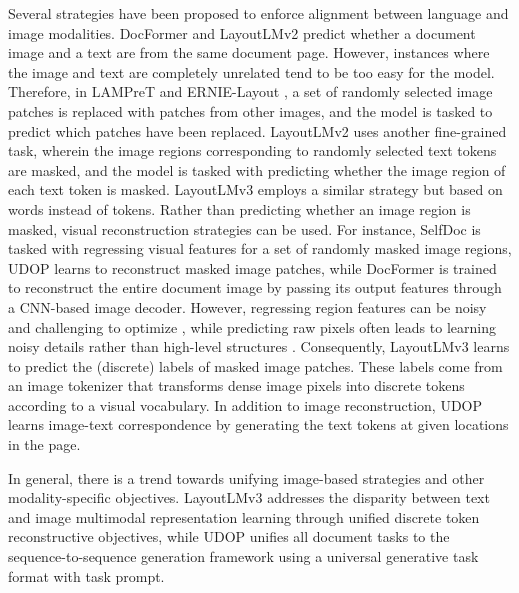 Several strategies have been proposed to enforce alignment between language and image modalities. DocFormer \citep{appalaraju2021docformer} and LayoutLMv2 \citep{xu2020layoutlmv2} predict whether a document image and a text are from the same document page. However, instances where the image and text are completely unrelated tend to be too easy for the model. Therefore, in \ac{LAMPreT} \citep{wu2021lampret} and ERNIE-Layout \citep{peng2022ernie}, a set of randomly selected image patches is replaced with patches from other images, and the model is tasked to predict which patches have been replaced. LayoutLMv2 uses another fine-grained task, wherein the image regions corresponding to randomly selected text tokens are masked, and the model is tasked with predicting whether the image region of each text token is masked. LayoutLMv3 \citep{huang2022layoutlmv3} employs a similar strategy but based on words instead of tokens. Rather than predicting whether an image region is masked, visual reconstruction strategies can be used. For instance, SelfDoc \citep{li2021selfdoc} is tasked with regressing visual features for a set of randomly masked image regions, UDOP \citep{tang2023unifying} learns to reconstruct masked image patches, while DocFormer \citep{appalaraju2021docformer} is trained to reconstruct the entire document image by passing its output features through a \ac{CNN}-based image decoder. However, regressing region features can be noisy and challenging to optimize \citep{cho2020x}, while predicting raw pixels often leads to learning noisy details rather than high-level structures \citep{ramesh2021zero}. Consequently, LayoutLMv3 learns to predict the (discrete) labels of masked image patches. These labels come from an image tokenizer that transforms dense image pixels into discrete tokens according to a visual vocabulary. In addition to image reconstruction, UDOP learns image-text correspondence by generating the text tokens at given locations in the page. 

In general, there is a trend towards unifying image-based strategies and other modality-specific objectives. LayoutLMv3 addresses the disparity between text and image multimodal representation learning through unified discrete token reconstructive objectives, while UDOP unifies all document tasks to the sequence-to-sequence
generation framework using a universal generative task format with task prompt.

